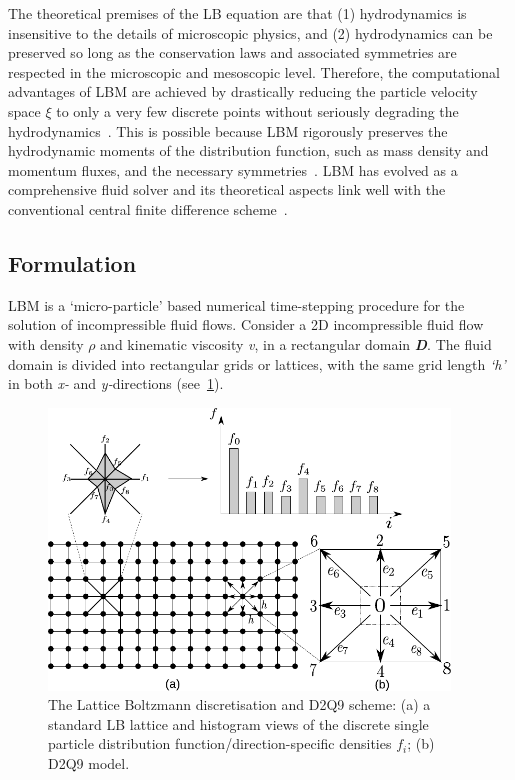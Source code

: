The theoretical premises of the LB equation are that (1) hydrodynamics is 
insensitive to the details of microscopic physics, and (2) hydrodynamics can be 
preserved so long as the conservation laws and associated symmetries are 
respected in the microscopic and mesoscopic level. Therefore, the computational 
advantages of LBM are achieved by drastically reducing the particle velocity 
space $\xi$ to only a very few discrete points without seriously degrading the
hydrodynamics~\citep{Mei2000}. This is possible because LBM rigorously 
preserves the hydrodynamic moments of the distribution function, such as mass 
density and momentum fluxes, and the necessary 
symmetries~\citep{He1997a,He1997b}.
LBM has evolved as a comprehensive fluid solver and its theoretical aspects 
link well with the conventional central finite difference 
scheme~\citep{Cook2004}.

\subsection{Formulation}

LBM is a `micro-particle' based numerical time-stepping procedure for the 
solution of incompressible fluid flows. Consider a 2D incompressible fluid flow 
with density $\rho$ and kinematic viscosity \textit{v}, in a rectangular domain 
\textit{\textbf{D}}. The fluid domain is divided into rectangular grids or 
lattices, with the same grid length \textit{`h'} in both \textit{x-} and 
\textit{y-}directions (see~\cref{fig:D2Q9}). 

\begin{figure}[htpb]
	\centering
	\includegraphics[width=0.95\textwidth]{D2Q9}
	\caption[The lattice Boltzmann discretisation and D2Q9 scheme]{The Lattice 
	Boltzmann discretisation and D2Q9 scheme: (a) a standard LB lattice and 
	histogram views of the discrete single particle distribution 
	function/direction-specific densities $f_i$; (b) D2Q9 model.}
	\label{fig:D2Q9}
\end{figure}

